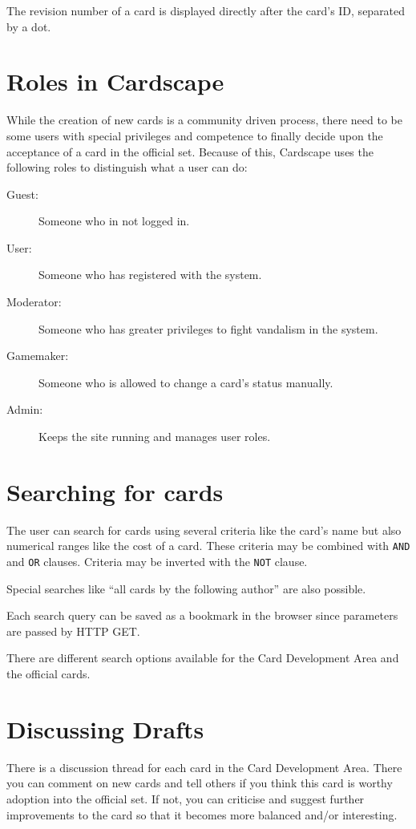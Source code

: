 \documentclass[a4paper, 11pt]{scrbook}
\begin{document}
The revision number of a card is displayed directly after the card's ID, separated by a dot.

\section{Roles in Cardscape}
While the creation of new cards is a community driven process, there need to be some users with special privileges and competence to finally decide upon the acceptance of a card in the official set. Because of this, Cardscape uses the following roles to distinguish what a user can do:

\begin{description}
 \item[Guest:] Someone who in not logged in.
 \item[User:] Someone who has registered with the system.
 \item[Moderator:] Someone who has greater privileges to fight vandalism in the system.
 \item[Gamemaker:] Someone who is allowed to change a card's status manually.
 \item[Admin:] Keeps the site running and manages user roles.
\end{description}

\section{Searching for cards}
The user can search for cards using several criteria like the card's name but also numerical ranges like the cost of a card. These criteria may be combined with \texttt{AND} and \texttt{OR} clauses. Criteria may be inverted with the \texttt{NOT} clause.

Special searches like ``all cards by the following author'' are also possible.

Each search query can be saved as a bookmark in the browser since parameters are passed by HTTP GET.

There are different search options available for the Card Development Area and the official cards.

\section{Discussing Drafts}
There is a discussion thread for each card in the Card Development Area. There you can comment on new cards and tell others if you think this card is worthy adoption into the official set. If not, you can criticise and suggest further improvements to the card so that it becomes more balanced and/or interesting.
\end{document}
